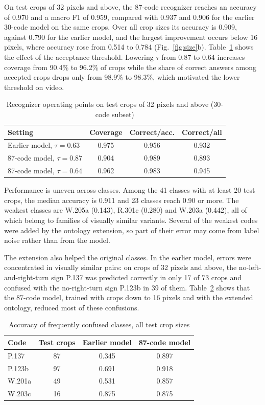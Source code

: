 \documentclass[conference,a4paper]{IEEEtran}
\begin{document}
On test crops of 32 pixels and above, the 87-code recognizer reaches an accuracy of 0.970 and a macro F1 of 0.959, compared with 0.937 and 0.906 for the earlier 30-code model on the same crops. Over all crop sizes its accuracy is 0.909, against 0.790 for the earlier model, and the largest improvement occurs below 16 pixels, where accuracy rose from 0.514 to 0.784 (Fig.~\ref{fig:size}b). Table~\ref{tab:op} shows the effect of the acceptance threshold. Lowering $\tau$ from 0.87 to 0.64 increases coverage from 90.4\% to 96.2\% of crops while the share of correct answers among accepted crops drops only from 98.9\% to 98.3\%, which motivated the lower threshold on video.

\begin{table}[t]
\centering
\caption{Recognizer operating points on test crops of 32 pixels and above (30-code subset)}
\label{tab:op}
\begin{tabular}{lccc}
\toprule
Setting & Coverage & Correct/acc. & Correct/all \\
\midrule
Earlier model, $\tau = 0.63$ & 0.975 & 0.956 & 0.932 \\
87-code model, $\tau = 0.87$ & 0.904 & 0.989 & 0.893 \\
87-code model, $\tau = 0.64$ & 0.962 & 0.983 & 0.945 \\
\bottomrule
\end{tabular}
\end{table}

Performance is uneven across classes. Among the 41 classes with at least 20 test crops, the median accuracy is 0.911 and 23 classes reach 0.90 or more. The weakest classes are W.205a (0.143), R.301c (0.280) and W.203a (0.442), all of which belong to families of visually similar variants. Several of the weakest codes were added by the ontology extension, so part of their error may come from label noise rather than from the model.

The extension also helped the original classes. In the earlier model, errors were concentrated in visually similar pairs: on crops of 32 pixels and above, the no-left-and-right-turn sign P.137 was predicted correctly in only 17 of 73 crops and confused with the no-right-turn sign P.123b in 39 of them. Table~\ref{tab:pairs} shows that the 87-code model, trained with crops down to 16 pixels and with the extended ontology, reduced most of these confusions.

\begin{table}[t]
\centering
\caption{Accuracy of frequently confused classes, all test crop sizes}
\label{tab:pairs}
\begin{tabular}{lccc}
\toprule
Code & Test crops & Earlier model & 87-code model \\
\midrule
P.137 & 87 & 0.345 & 0.897 \\
P.123b & 97 & 0.691 & 0.918 \\
W.201a & 49 & 0.531 & 0.857 \\
W.203c & 16 & 0.875 & 0.875 \\
\bottomrule
\end{tabular}
\end{table}
\end{document}
